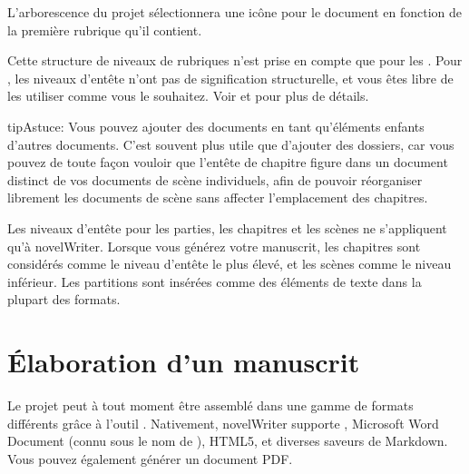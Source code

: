 \documentclass[a4paper,11pt,french]{sphinxmanual}
\begin{document}
\sphinxAtStartPar
L’arborescence du projet sélectionnera une icône pour le document en fonction de la première rubrique qu’il contient.

\sphinxAtStartPar
Cette structure de niveaux de rubriques n’est prise en compte que pour les {\hyperref[\detokenize{int_glossary:term-Novel-Documents}]{}}. Pour {\hyperref[\detokenize{int_glossary:term-Project-Notes}]{}}, les niveaux d’en\sphinxhyphen{}tête n’ont pas de signification structurelle, et vous êtes libre de les utiliser comme vous le souhaitez. Voir {\hyperref[\detokenize{project_structure:a-struct}]{}} et {\hyperref[\detokenize{project_references:a-references}]{}} pour plus de détails.

\begin{sphinxadmonition}{tip}{Astuce:}
\sphinxAtStartPar
Vous pouvez ajouter des documents en tant qu’éléments enfants d’autres documents. C’est souvent plus utile que d’ajouter des dossiers, car vous pouvez de toute façon vouloir que l’en\sphinxhyphen{}tête de chapitre figure dans un document distinct de vos documents de scène individuels, afin de pouvoir réorganiser librement les documents de scène sans affecter l’emplacement des chapitres.
\end{sphinxadmonition}

\sphinxAtStartPar
{}Les niveaux d’en\sphinxhyphen{}tête pour les parties, les chapitres et les scènes ne s’appliquent qu’à novelWriter. Lorsque vous générez votre manuscrit, les chapitres sont considérés comme le niveau d’en\sphinxhyphen{}tête le plus élevé, et les scènes comme le niveau inférieur. Les partitions sont insérées comme des éléments de texte dans la plupart des formats.


\section{Élaboration d’un manuscrit}
\label{\detokenize{usage_breakdown:building-a-manuscript}}\label{\detokenize{usage_breakdown:a-breakdown-export}}
\sphinxAtStartPar
Le projet peut à tout moment être assemblé dans une gamme de formats différents grâce à l’outil . Nativement, novelWriter supporte , Microsoft Word Document (connu sous le nom de ), HTML5, et diverses saveurs de Markdown. Vous pouvez également générer un document PDF.
\end{document}
